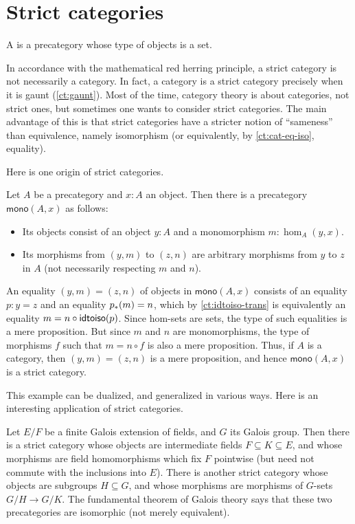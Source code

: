 \section{Strict categories}
\label{sec:strict-categories}

\begin{defn}
  A  is a precategory whose type of objects is a set.
\end{defn}

In accordance with the mathematical red herring principle, a strict category is not necessarily a category.
In fact, a category is a strict category precisely when it is gaunt (\autoref{ct:gaunt}).
Most of the time, category theory is about categories, not strict ones, but sometimes one wants to consider strict categories.
The main advantage of this is that strict categories have a stricter notion of ``sameness'' than equivalence, namely isomorphism (or equivalently, by \autoref{ct:cat-eq-iso}, equality).

Here is one origin of strict categories.

\begin{eg}
  Let $A$ be a precategory and $x:A$ an object.
  Then there is a precategory $\mathsf{mono}(A,x)$ as follows:
  \begin{itemize}
  \item Its objects consist of an object $y:A$ and a monomorphism $m:\hom_A(y,x)$.
  \item Its morphisms from $(y,m)$ to $(z,n)$ are arbitrary morphisms from $y$ to $z$ in $A$ (not necessarily respecting $m$ and $n$).
  \end{itemize}
  An equality $(y,m)=(z,n)$ of objects in $\mathsf{mono}(A,x)$ consists of an equality $p:y=z$ and an equality ${p}_{*}\mathopen{}\left({m}\right)\mathclose{}=n$, which by \autoref{ct:idtoiso-trans} is equivalently an equality $m=n\circ \mathsf{idtoiso}(p)$.
  Since hom-sets are sets, the type of such equalities is a mere proposition.
  But since $m$ and $n$ are monomorphisms, the type of morphisms $f$ such that $m = n\circ f$ is also a mere proposition.
  Thus, if $A$ is a category, then $(y,m)=(z,n)$ is a mere proposition, and hence $\mathsf{mono}(A,x)$ is a strict category.
\end{eg}

This example can be dualized, and generalized in various ways.
Here is an interesting application of strict categories.

\begin{eg}\label{ct:galois}
  Let $E/F$ be a finite Galois extension of fields, and $G$ its Galois group.
  Then there is a strict category whose objects are intermediate fields $F\subseteq K\subseteq E$, and whose morphisms are field homomorphisms which fix $F$ pointwise (but need not commute with the inclusions into $E$).
  There is another strict category whose objects are subgroups $H\subseteq G$, and whose morphisms are morphisms of $G$-sets $G/H \to G/K$.
  The fundamental theorem of Galois theory says that these two precategories are isomorphic (not merely equivalent).
\end{eg}


